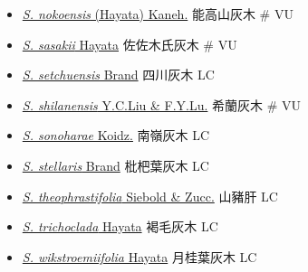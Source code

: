 \begin{itemize}
\begin{itemize}
        \item[] \href{http://www.theplantlist.org/tpl1.1/search?q=Symplocos+nokoensis}{\textit{S. nokoensis} (Hayata) Kaneh.}   能高山灰木  \# VU
        \item[] \href{http://www.theplantlist.org/tpl1.1/search?q=Symplocos+sasakii}{\textit{S. sasakii} Hayata}   佐佐木氏灰木  \# VU
        \item[] \href{http://www.theplantlist.org/tpl1.1/search?q=Symplocos+setchuensis}{\textit{S. setchuensis} Brand}   四川灰木   LC
        \item[] \href{http://www.theplantlist.org/tpl1.1/search?q=Symplocos+shilanensis}{\textit{S. shilanensis} Y.C.Liu \& F.Y.Lu.}   希蘭灰木  \# VU
        \item[] \href{http://www.theplantlist.org/tpl1.1/search?q=Symplocos+sonoharae}{\textit{S. sonoharae} Koidz.}   南嶺灰木   LC
        \item[] \href{http://www.theplantlist.org/tpl1.1/search?q=Symplocos+stellaris}{\textit{S. stellaris} Brand}   枇杷葉灰木   LC
        \item[] \href{http://www.theplantlist.org/tpl1.1/search?q=Symplocos+theophrastifolia}{\textit{S. theophrastifolia} Siebold \& Zucc.}   山豬肝   LC
        \item[] \href{http://www.theplantlist.org/tpl1.1/search?q=Symplocos+trichoclada}{\textit{S. trichoclada} Hayata}   褐毛灰木   LC
        \item[] \href{http://www.theplantlist.org/tpl1.1/search?q=Symplocos+wikstroemiifolia}{\textit{S. wikstroemiifolia} Hayata}   月桂葉灰木   LC
  \end{itemize}
  \end{itemize}
